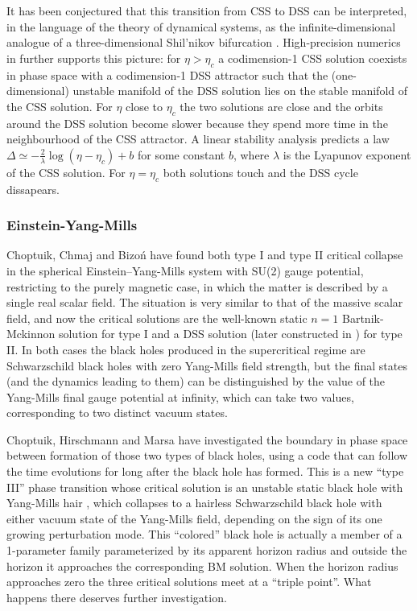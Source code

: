 \documentclass{article}
\begin{document}
It has been conjectured that this transition from CSS to DSS can be
interpreted, in the language of the theory of dynamical systems, as
the infinite-dimensional analogue of a three-dimensional Shil'nikov
bifurcation \cite{Lechner}. High-precision numerics in
\cite{Aichelburg4} further supports this picture: for $\eta>\eta_c$ a
codimension-1 CSS solution coexists in phase space with a
codimension-1 DSS attractor such that the (one-dimensional) unstable
manifold of the DSS solution lies on the stable manifold of the CSS
solution.  For $\eta$ close to $\eta_c$ the two solutions are close and
the orbits around the DSS solution become slower because they spend
more time in the neighbourhood of the CSS attractor. A linear
stability analysis predicts a law $\Delta\simeq -\frac{2}{\lambda}
\log(\eta-\eta_c)+b$ for some constant $b$, where $\lambda$ is the
Lyapunov exponent of the CSS solution. For $\eta=\eta_c$ both
solutions touch and the DSS cycle dissapears.


\subsubsection{Einstein-Yang-Mills}

Choptuik, Chmaj and Bizo\'n \cite{ChoptuikChmajBizon} have found
both type I and type II critical collapse in the spherical
Einstein--Yang-Mills system with SU(2) gauge potential, restricting
to the purely magnetic case, in which the matter is described
by a single real scalar field. The situation
is very similar to that of the massive scalar field, and now the
critical solutions are the well-known static $n=1$ Bartnik-Mckinnon
solution \cite{BartnikMcKinnon} for type I and a DSS solution 
(later constructed in \cite{Gundlach_EYM}) for type II.
In both cases the black holes produced in the supercritical regime
are Schwarzschild black holes with zero Yang-Mills field strength,
but the final states (and the dynamics leading to them) can be
distinguished by the value of the Yang-Mills final gauge potential at
infinity, which can take two values, corresponding to two distinct
vacuum states.

Choptuik, Hirschmann and Marsa \cite{ChoptuikHirschmannMarsa} have
investigated the boundary in phase space between formation of those
two types of black holes, using a code that can follow the time
evolutions for long after the black hole has formed. This is a new
``type III'' phase transition whose critical solution is an unstable
static black hole with Yang-Mills hair \cite{Bizon0,VolkovGaltsov},
which collapses to a hairless Schwarzschild black hole with either
vacuum state of the Yang-Mills field, depending on the sign of its one
growing perturbation mode. This ``colored'' black hole is actually a
member of a 1-parameter family parameterized by its apparent
horizon radius and outside the horizon it approaches the corresponding
BM solution. When the horizon radius approaches zero the three critical
solutions meet at a ``triple point''. What happens there deserves
further investigation.
\end{document}
